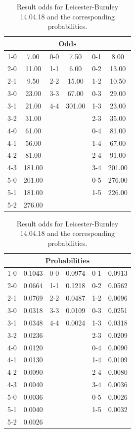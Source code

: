 \begin{table}[H]
\begin{subtable}{1\textwidth}
\centering
\begin{tabular}{|lc|lc|lc|}
\multicolumn{6}{c}{Odds}                   \\
\hline
1-0 & 7.00   & 0-0 & 7.50   & 0-1 & 8.00   \\
2-0 & 11.00  & 1-1 & 6.00   & 0-2 & 13.00  \\
2-1 & 9.50   & 2-2 & 15.00  & 1-2 & 10.50  \\
3-0 & 23.00  & 3-3 & 67.00  & 0-3 & 29.00  \\
3-1 & 21.00  & 4-4 & 301.00 & 1-3 & 23.00  \\
3-2 & 31.00  &     &        & 2-3 & 35.00  \\
4-0 & 61.00  &     &        & 0-4 & 81.00  \\
4-1 & 56.00  &     &        & 1-4 & 67.00  \\
4-2 & 81.00  &     &        & 2-4 & 91.00  \\
4-3 & 181.00 &     &        & 3-4 & 201.00 \\
5-0 & 201.00 &     &        & 0-5 & 276.00 \\
5-1 & 181.00 &     &        & 1-5 & 226.00 \\
5-2 & 276.00 &     &        &     &        \\
\hline
\end{tabular}
\end{subtable}
\bigskip
\begin{subtable}{1\textwidth}
\centering
\begin{tabular}{|ll|ll|ll|}
\multicolumn{6}{c}{Probabilities}                         \\
\hline
1-0 & 0.1043 & 0-0 & 0.0974 & 0-1 & 0.0913  \\
2-0 & 0.0664 & 1-1 & 0.1218 & 0-2 & 0.0562 \\
2-1 & 0.0769 & 2-2 & 0.0487 & 1-2 & 0.0696 \\
3-0 & 0.0318  & 3-3 & 0.0109 & 0-3 & 0.0251 \\
3-1 & 0.0348 & 4-4 & 0.0024 & 1-3 & 0.0318  \\
3-2 & 0.0236 &     &          & 2-3 & 0.0209 \\
4-0 & 0.0120 &     &          & 0-4 & 0.0090 \\
4-1 & 0.0130 &     &          & 1-4 & 0.0109 \\
4-2 & 0.0090 &     &          & 2-4 & 0.0080  \\
4-3 & 0.0040 &     &          & 3-4 & 0.0036 \\
5-0 & 0.0036 &     &          & 0-5 & 0.0026 \\
5-1 & 0.0040 &     &          & 1-5 & 0.0032 \\
5-2 & 0.0026 &     &          &     &         \\
\hline
\end{tabular}
\end{subtable}
\caption{Result odds for Leicester-Burnley 14.04.18 and the corresponding probabilities.}
\label{tab:odds_probabilities}
\end{table}



